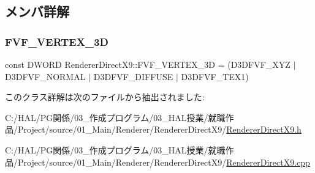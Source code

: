 \subsection{メンバ詳解}
\mbox{\label{class_renderer_direct_x9_a80ce0089b01354986332553353625da6}} 
\subsubsection{\texorpdfstring{F\+V\+F\+\_\+\+V\+E\+R\+T\+E\+X\+\_\+3D}{FVF\_VERTEX\_3D}}
{\footnotesize\ttfamily const D\+W\+O\+RD Renderer\+Direct\+X9\+::\+F\+V\+F\+\_\+\+V\+E\+R\+T\+E\+X\+\_\+3D = (D3\+D\+F\+V\+F\+\_\+\+X\+YZ $\vert$ D3\+D\+F\+V\+F\+\_\+\+N\+O\+R\+M\+AL $\vert$ D3\+D\+F\+V\+F\+\_\+\+D\+I\+F\+F\+U\+SE $\vert$ D3\+D\+F\+V\+F\+\_\+\+T\+E\+X1)\hspace{0.3cm}{\ttfamily [static]}}



このクラス詳解は次のファイルから抽出されました\+:\begin{DoxyCompactItemize}
\item 
C\+:/\+H\+A\+L/\+P\+G関係/03\+\_\+作成プログラム/03\+\_\+\+H\+A\+L授業/就職作品/\+Project/source/01\+\_\+\+Main/\+Renderer/\+Renderer\+Direct\+X9/\mbox{\hyperlink{_renderer_direct_x9_8h}{Renderer\+Direct\+X9.\+h}}\item 
C\+:/\+H\+A\+L/\+P\+G関係/03\+\_\+作成プログラム/03\+\_\+\+H\+A\+L授業/就職作品/\+Project/source/01\+\_\+\+Main/\+Renderer/\+Renderer\+Direct\+X9/\mbox{\hyperlink{_renderer_direct_x9_8cpp}{Renderer\+Direct\+X9.\+cpp}}\end{DoxyCompactItemize}

